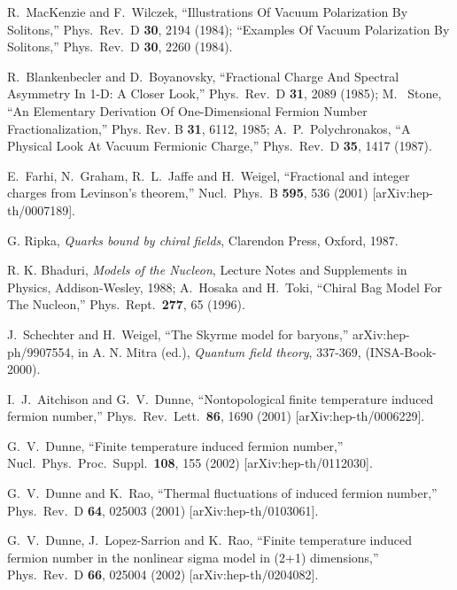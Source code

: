 \documentclass[a4paper,prd,showpacs,showkeys]{revtex4}
\begin{document}
{{\begin{thebibliography}{99}
 R.~MacKenzie and F.~Wilczek,
``Illustrations Of Vacuum Polarization By Solitons,''
Phys.\ Rev.\ D {\bf 30}, 2194 (1984);
 ``Examples Of Vacuum Polarization By Solitons,''
Phys.\ Rev.\ D {\bf 30}, 2260 (1984).

 
  R.~Blankenbecler and D.~Boyanovsky,
``Fractional Charge And Spectral Asymmetry In 1-D: A Closer Look,''
Phys.\ Rev.\ D {\bf 31}, 2089 (1985);
M. ~Stone,
``An Elementary Derivation Of One-Dimensional Fermion Number Fractionalization,''
Phys. Rev. B {\bf 31}, 6112, 1985;
A.~P.~Polychronakos,
``A Physical Look At Vacuum Fermionic Charge,''
Phys.\ Rev.\ D {\bf 35}, 1417 (1987).

 E.~Farhi, N.~Graham, R.~L.~Jaffe and H.~Weigel,
``Fractional and integer charges from Levinson's theorem,''
Nucl.\ Phys.\ B {\bf 595}, 536 (2001)
[arXiv:hep-th/0007189].

 G. Ripka, {\it Quarks bound by chiral fields}, Clarendon Press, Oxford, 1987.

 R. K. Bhaduri, {\it Models of the Nucleon}, Lecture Notes and Supplements in Physics, Addison-Wesley, 1988;  A.~Hosaka and H.~Toki,
``Chiral Bag Model For The Nucleon,''
Phys.\ Rept.\  {\bf 277}, 65 (1996).

 J.~Schechter and H.~Weigel,
``The Skyrme model for baryons,''
arXiv:hep-ph/9907554,
in A. N. Mitra (ed.), {\it Quantum field theory},
337-369, (INSA-Book-2000).

 I.~J.~Aitchison and G.~V.~Dunne,
``Nontopological finite temperature induced fermion number,''
Phys.\ Rev.\ Lett.\  {\bf 86}, 1690 (2001)
[arXiv:hep-th/0006229].

 G.~V.~Dunne,
``Finite temperature induced fermion number,''
Nucl.\ Phys.\ Proc.\ Suppl.\  {\bf 108}, 155 (2002)
[arXiv:hep-th/0112030].

 G.~V.~Dunne and K.~Rao,
``Thermal fluctuations of induced fermion number,''
Phys.\ Rev.\ D {\bf 64}, 025003 (2001)
[arXiv:hep-th/0103061].

G.~V.~Dunne, J.~Lopez-Sarrion and K.~Rao,
``Finite temperature induced fermion number in the nonlinear sigma model  in (2+1) dimensions,''
Phys.\ Rev.\ D {\bf 66}, 025004 (2002)
[arXiv:hep-th/0204082].




\end{thebibliography}}}
\end{document}
